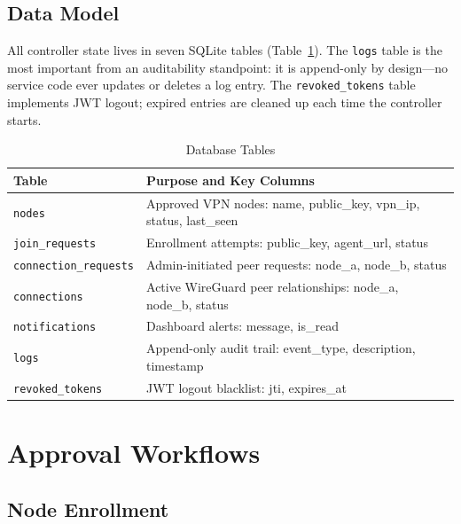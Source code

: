 \documentclass[conference]{IEEEtran}
\begin{document}
\subsection{Data Model}

All controller state lives in seven SQLite tables (Table~\ref{tab:schema}).
The \texttt{logs} table is the most important from an auditability standpoint:
it is append-only by design---no service code ever updates or deletes a log
entry. The \texttt{revoked\_tokens} table implements JWT logout; expired
entries are cleaned up each time the controller starts.

\begin{table}[!t]
\caption{Database Tables}
\label{tab:schema}
\centering
\small
\setlength{\tabcolsep}{4pt}
\begin{tabularx}{\columnwidth}{@{}lX@{}}
\toprule
\textbf{Table} & \textbf{Purpose and Key Columns} \\
\midrule
\texttt{nodes}               & Approved VPN nodes: name, public\_key, vpn\_ip, status, last\_seen \\
\texttt{join\_requests}      & Enrollment attempts: public\_key, agent\_url, status \\
\texttt{connection\_requests}& Admin-initiated peer requests: node\_a, node\_b, status \\
\texttt{connections}         & Active WireGuard peer relationships: node\_a, node\_b, status \\
\texttt{notifications}       & Dashboard alerts: message, is\_read \\
\texttt{logs}                & Append-only audit trail: event\_type, description, timestamp \\
\texttt{revoked\_tokens}     & JWT logout blacklist: jti, expires\_at \\
\bottomrule
\end{tabularx}
\end{table}


\section{Approval Workflows}
\label{sec:lifecycle}

\subsection{Node Enrollment}
\end{document}
